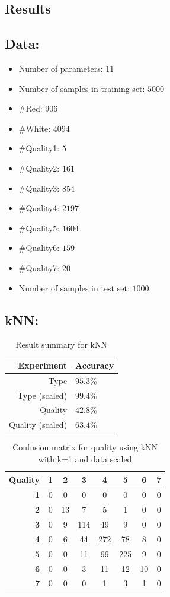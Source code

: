 \documentclass[twoside]{article}
\begin{document}
\begin{multicols}{2}
\section{Results}
\subsection*{\textbf{Data:}}
\begin{itemize}
  \item Number of parameters: 11
  \item Number of samples in training set: $5000$
  \item \#Red: $906$
  \item \#White: $4094$
  \item \#Quality1: $5$
  \item \#Quality2: $161$
  \item \#Quality3: $854$
  \item \#Quality4: $2197$
  \item \#Quality5: $1604$
  \item \#Quality6: $159$
  \item \#Quality7: $20$
  \item Number of samples in test set: $1000$
\end{itemize}

\subsection*{\textbf{kNN:}}
\begin{table}[H]
\caption{Result summary for kNN}
\centering
\begin{tabular}{r|l}
\textbf{Experiment} & \textbf{Accuracy}\\
\midrule
Type  & $95.3\%$\\
Type (scaled) & $99.4\%$\\
\hline
Quality & $42.8\%$\\
Quality (scaled) & $63.4\%$\\
\end{tabular}
\end{table}

\begin{table}[H]
\caption{Confusion matrix for quality using kNN with k=1 and data scaled}
\centering
\begin{tabular}{r||c|c|c|c|c|c|c}
\textbf{Quality} & \textbf{1} & \textbf{2} & \textbf{3} & \textbf{4} & \textbf{5} & \textbf{6} & \textbf{7}\\
\hline \hline
\textbf{1} & 0 & 0 & 0 & 0 & 0 & 0 & 0\\
\hline
\textbf{2} & 0 & 13 & 7 & 5 & 1 & 0 & 0\\
\hline
\textbf{3} & 0 & 9 & 114 & 49 & 9 & 0 & 0\\
\hline
\textbf{4} & 0 & 6 & 44 & 272 & 78 & 8 & 0\\
\hline
\textbf{5} & 0 & 0 & 11 & 99 & 225 & 9 & 0\\
\hline
\textbf{6} & 0 & 0 & 3 & 11 & 12 & 10 & 0\\
\hline
\textbf{7} & 0 & 0 & 0 & 1 & 3 & 1 & 0\\
\end{tabular}
\end{table}



\end{multicols}
\end{document}

